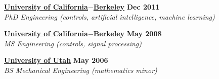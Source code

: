 %
\href{http://www.berkeley.edu/}{\textbf{University of California$-$Berkeley}} \hfill \textbf{Dec 2011}\\
\textit{PhD Engineering (controls, artificial intelligence, machine learning)}

\halfblankline

\href{http://www.berkeley.edu/}{\textbf{University of California$-$Berkeley}} \hfill \textbf{May 2008}\\
\textit{MS Engineering (controls, signal processing)}

\halfblankline

\href{http://www.utah.edu/}{\textbf{University of Utah}} \hfill \textbf{May 2006}\\
\textit{BS Mechanical Engineering (mathematics minor)}
